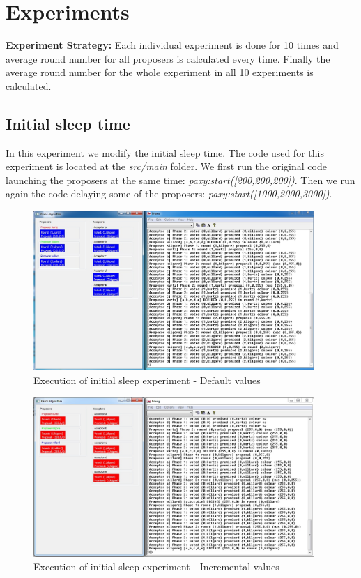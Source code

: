 \section{Experiments}
\label{sec:Experiments}

\textbf{Experiment Strategy:} Each individual experiment is done for 10 times
and average round number for all proposers is calculated every time. Finally
the average round number for the whole experiment in all 10 experiments is
calculated.

\subsection{Initial sleep time}
In this experiment we modify the initial sleep time. The code used for this experiment
is located at the \textit{src/main} folder. We first run the original code launching the
proposers at the same time: \textit{paxy:start([200,200,200])}. Then we run again the code delaying
some of the proposers: \textit{paxy:start([1000,2000,3000])}.

\begin{figure}[h!]
  \centering
    \includegraphics[width=0.95\textwidth]{./3_Experiments/images/initSleep1.jpg}
    \caption{Execution of initial sleep experiment - Default values\label{fig:init_sleep1}}
\end{figure}
\begin{figure}[h!]
  \centering
    \includegraphics[width=0.95\textwidth]{./3_Experiments/images/initSleep2.jpg}
    \caption{Execution of initial sleep experiment - Incremental values\label{fig:init_sleep2}}
\end{figure}

